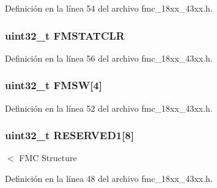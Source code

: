Definición en la línea 54 del archivo fmc\+\_\+18xx\+\_\+43xx.\+h.

\subsubsection[{\texorpdfstring{F\+M\+S\+T\+A\+T\+C\+LR}{FMSTATCLR}}]{ uint32\+\_\+t F\+M\+S\+T\+A\+T\+C\+LR}\hypertarget{struct_l_p_c___f_m_c___t_a93d0244a3c0107705443b263777c470d}{}\label{struct_l_p_c___f_m_c___t_a93d0244a3c0107705443b263777c470d}


Definición en la línea 56 del archivo fmc\+\_\+18xx\+\_\+43xx.\+h.

\subsubsection[{\texorpdfstring{F\+M\+SW}{FMSW}}]{ uint32\+\_\+t F\+M\+SW\mbox{[}4\mbox{]}}\hypertarget{struct_l_p_c___f_m_c___t_af4b7c75f896e57bb4d119d805b7b56d3}{}\label{struct_l_p_c___f_m_c___t_af4b7c75f896e57bb4d119d805b7b56d3}


Definición en la línea 52 del archivo fmc\+\_\+18xx\+\_\+43xx.\+h.

\subsubsection[{\texorpdfstring{R\+E\+S\+E\+R\+V\+E\+D1}{RESERVED1}}]{ uint32\+\_\+t R\+E\+S\+E\+R\+V\+E\+D1\mbox{[}8\mbox{]}}\hypertarget{struct_l_p_c___f_m_c___t_af618b58ac3978bca4c8977fdfb17af6b}{}\label{struct_l_p_c___f_m_c___t_af618b58ac3978bca4c8977fdfb17af6b}
$<$ F\+MC Structure 

Definición en la línea 48 del archivo fmc\+\_\+18xx\+\_\+43xx.\+h.

